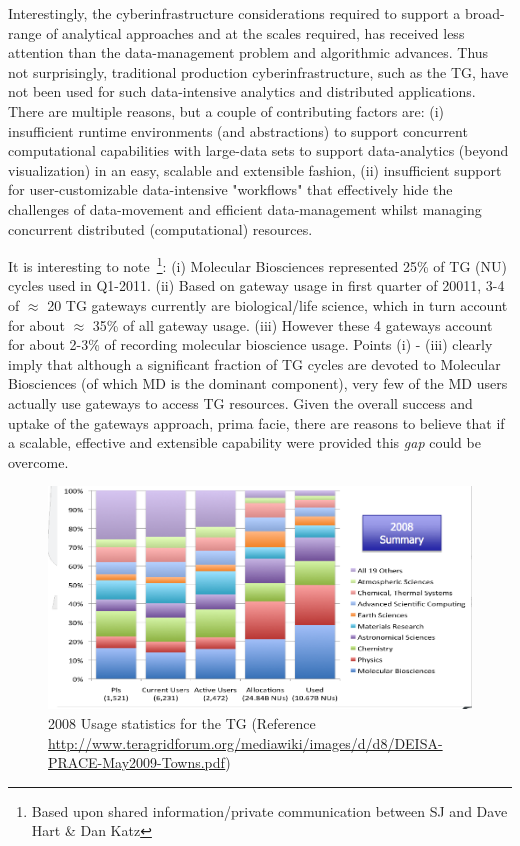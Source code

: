\documentclass[]{article}
\begin{document}


Interestingly, the cyberinfrastructure considerations required to
support a broad-range of analytical approaches and at the scales
required, has received less attention than the data-management problem
and algorithmic advances.  Thus not surprisingly, traditional
production cyberinfrastructure, such as the TG, have not been used for
such data-intensive analytics and distributed applications. There are
multiple reasons, but a couple of contributing factors are: (i)
insufficient runtime environments (and abstractions) to support
concurrent computational capabilities with large-data sets to support
data-analytics (beyond visualization) in an easy, scalable and
extensible fashion, (ii) insufficient support for user-customizable
data-intensive "workflows" that effectively hide the challenges of
data-movement and efficient data-management whilst managing concurrent
distributed (computational) resources.

It is interesting to note~\footnote{Based upon shared
  information/private communication between SJ and Dave Hart \& Dan
  Katz}: (i) Molecular Biosciences represented 25\% of TG (NU) cycles
used in Q1-2011.  (ii) Based on gateway usage in first quarter of
20011, 3-4 of $\approx$ 20 TG gateways currently are biological/life
science, which in turn account for about $\approx$ 35\% of all gateway
usage. (iii) However these 4 gateways account for about 2-3\% of
recording molecular bioscience usage. Points (i) - (iii) clearly imply
that although a significant fraction of TG cycles are devoted to
Molecular Biosciences (of which MD is the dominant component), very
few of the MD users actually use gateways to access TG resources.
Given the overall success and uptake of the gateways approach, prima
facie, there are reasons to believe that if a scalable, effective and
extensible capability were provided this {\it gap} could be overcome.
 
\begin{figure}
 \centering
\includegraphics[scale=0.27]{figures/teragrid-discipline08}
\caption{\small 2008 Usage statistics for the TG (Reference
  \url{http://www.teragridforum.org/mediawiki/images/d/d8/DEISA-PRACE-May2009-Towns.pdf})}
  \label{tg2008}
\end{figure}
\end{document}
